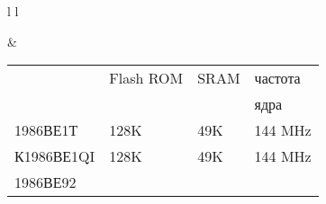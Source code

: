 \pagebreak
{}

\begin{tabular}{l l}


&

\begin{tabular}{l l l l}
& Flash ROM & SRAM & частота \\
&&& ядра \\
\hline
1986ВЕ1Т & 128K & 49K & 144 MHz\\
К1986ВЕ1QI & 128K & 49K & 144 MHz\\
1986ВЕ92 & & \\
\end{tabular}

\\

\end{tabular}

